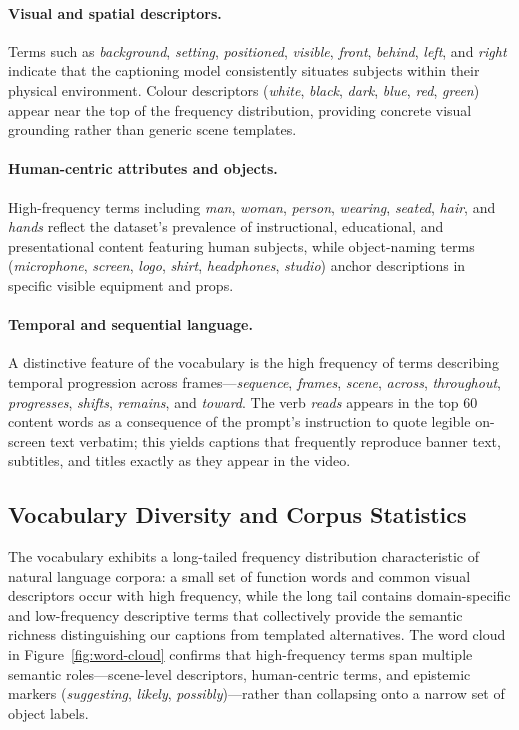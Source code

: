 \documentclass{article}
\begin{document}
\paragraph{Visual and spatial descriptors.}
Terms such as \textit{background}, \textit{setting}, \textit{positioned}, \textit{visible}, \textit{front}, \textit{behind}, \textit{left}, and \textit{right} indicate that the captioning model consistently situates subjects within their physical environment. Colour descriptors (\textit{white}, \textit{black}, \textit{dark}, \textit{blue}, \textit{red}, \textit{green}) appear near the top of the frequency distribution, providing concrete visual grounding rather than generic scene templates.

\paragraph{Human-centric attributes and objects.}
High-frequency terms including \textit{man}, \textit{woman}, \textit{person}, \textit{wearing}, \textit{seated}, \textit{hair}, and \textit{hands} reflect the dataset's prevalence of instructional, educational, and presentational content featuring human subjects, while object-naming terms (\textit{microphone}, \textit{screen}, \textit{logo}, \textit{shirt}, \textit{headphones}, \textit{studio}) anchor descriptions in specific visible equipment and props.

\paragraph{Temporal and sequential language.}
A distinctive feature of the vocabulary is the high frequency of terms describing temporal progression across frames---\textit{sequence}, \textit{frames}, \textit{scene}, \textit{across}, \textit{throughout}, \textit{progresses}, \textit{shifts}, \textit{remains}, and \textit{toward}. The verb \textit{reads} appears in the top 60 content words as a consequence of the prompt's instruction to quote legible on-screen text verbatim; this yields captions that frequently reproduce banner text, subtitles, and titles exactly as they appear in the video.

\subsection{Vocabulary Diversity and Corpus Statistics}

The vocabulary exhibits a long-tailed frequency distribution characteristic of natural language corpora: a small set of function words and common visual descriptors occur with high frequency, while the long tail contains domain-specific and low-frequency descriptive terms that collectively provide the semantic richness distinguishing our captions from templated alternatives. The word cloud in Figure~\ref{fig:word-cloud} confirms that high-frequency terms span multiple semantic roles---scene-level descriptors, human-centric terms, and epistemic markers (\textit{suggesting}, \textit{likely}, \textit{possibly})---rather than collapsing onto a narrow set of object labels.
\end{document}
